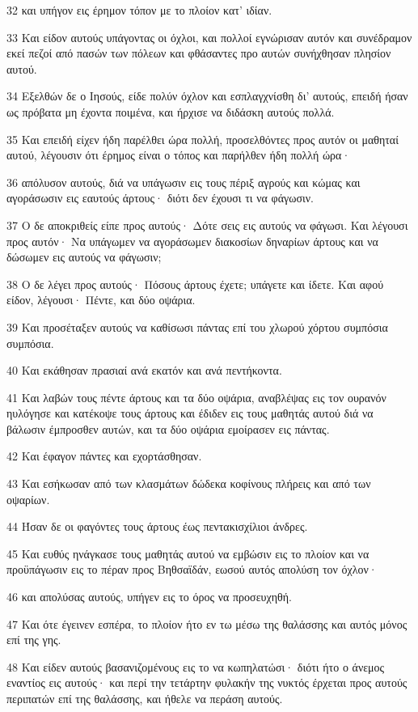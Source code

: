 \par 32 και υπήγον εις έρημον τόπον με το πλοίον κατ' ιδίαν.
\par 33 Και είδον αυτούς υπάγοντας οι όχλοι, και πολλοί εγνώρισαν αυτόν και συνέδραμον εκεί πεζοί από πασών των πόλεων και φθάσαντες προ αυτών συνήχθησαν πλησίον αυτού.
\par 34 Εξελθών δε ο Ιησούς, είδε πολύν όχλον και εσπλαγχνίσθη δι' αυτούς, επειδή ήσαν ως πρόβατα μη έχοντα ποιμένα, και ήρχισε να διδάσκη αυτούς πολλά.
\par 35 Και επειδή είχεν ήδη παρέλθει ώρα πολλή, προσελθόντες προς αυτόν οι μαθηταί αυτού, λέγουσιν ότι έρημος είναι ο τόπος και παρήλθεν ήδη πολλή ώρα·
\par 36 απόλυσον αυτούς, διά να υπάγωσιν εις τους πέριξ αγρούς και κώμας και αγοράσωσιν εις εαυτούς άρτους· διότι δεν έχουσι τι να φάγωσιν.
\par 37 Ο δε αποκριθείς είπε προς αυτούς· Δότε σεις εις αυτούς να φάγωσι. Και λέγουσι προς αυτόν· Να υπάγωμεν να αγοράσωμεν διακοσίων δηναρίων άρτους και να δώσωμεν εις αυτούς να φάγωσιν;
\par 38 Ο δε λέγει προς αυτούς· Πόσους άρτους έχετε; υπάγετε και ίδετε. Και αφού είδον, λέγουσι· Πέντε, και δύο οψάρια.
\par 39 Και προσέταξεν αυτούς να καθίσωσι πάντας επί του χλωρού χόρτου συμπόσια συμπόσια.
\par 40 Και εκάθησαν πρασιαί ανά εκατόν και ανά πεντήκοντα.
\par 41 Και λαβών τους πέντε άρτους και τα δύο οψάρια, αναβλέψας εις τον ουρανόν ηυλόγησε και κατέκοψε τους άρτους και έδιδεν εις τους μαθητάς αυτού διά να βάλωσιν έμπροσθεν αυτών, και τα δύο οψάρια εμοίρασεν εις πάντας.
\par 42 Και έφαγον πάντες και εχορτάσθησαν.
\par 43 Και εσήκωσαν από των κλασμάτων δώδεκα κοφίνους πλήρεις και από των οψαρίων.
\par 44 Ήσαν δε οι φαγόντες τους άρτους έως πεντακισχίλιοι άνδρες.
\par 45 Και ευθύς ηνάγκασε τους μαθητάς αυτού να εμβώσιν εις το πλοίον και να προϋπάγωσιν εις το πέραν προς Βηθσαϊδάν, εωσού αυτός απολύση τον όχλον·
\par 46 και απολύσας αυτούς, υπήγεν εις το όρος να προσευχηθή.
\par 47 Και ότε έγεινεν εσπέρα, το πλοίον ήτο εν τω μέσω της θαλάσσης και αυτός μόνος επί της γης.
\par 48 Και είδεν αυτούς βασανιζομένους εις το να κωπηλατώσι· διότι ήτο ο άνεμος εναντίος εις αυτούς· και περί την τετάρτην φυλακήν της νυκτός έρχεται προς αυτούς περιπατών επί της θαλάσσης, και ήθελε να περάση αυτούς.
